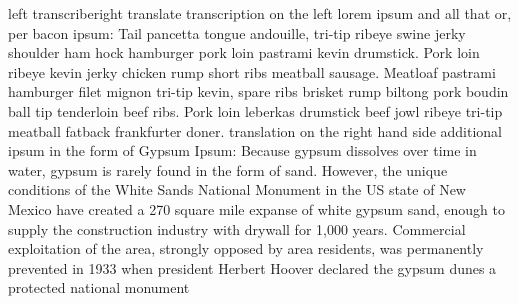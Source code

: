 





\begin{EOAtranscripted}{left transcribe}{right translate}
transcription on the  left
lorem ipsum and all that
or, per bacon ipsum:
Tail pancetta tongue andouille, tri-tip ribeye swine jerky shoulder ham hock hamburger pork loin pastrami kevin drumstick. Pork loin ribeye kevin jerky chicken rump short ribs meatball sausage. Meatloaf pastrami hamburger filet mignon tri-tip kevin, spare ribs brisket rump biltong pork boudin ball tip tenderloin beef ribs. Pork loin leberkas drumstick beef jowl ribeye tri-tip meatball fatback frankfurter doner.
\EOAnewpage
translation on the  right  hand side
additional ipsum
in the form of  Gypsum Ipsum:
Because gypsum dissolves over time in water, gypsum is rarely found in the form of sand. However, the unique conditions of the White Sands National Monument in the US state of New Mexico have created a 270 square mile expanse of white gypsum sand, enough to supply the construction industry with drywall for 1,000 years. Commercial exploitation of the area, strongly opposed by area residents, was permanently prevented in 1933 when president Herbert Hoover declared the gypsum dunes a protected national monument
\end{EOAtranscripted}


